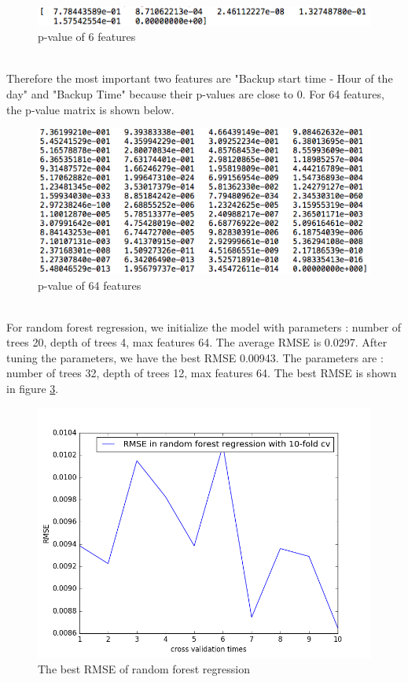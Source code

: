 \documentclass{article}
\begin{document}
\begin{figure}[htbp]
\centering
\includegraphics[width=.8\textwidth]{pvalue-6.png}
\caption{p-value of 6 features}
\label{fig:p6}
\end{figure}
\\
Therefore the most important two features are "Backup start time - Hour of the day" and "Backup Time" because their p-values are close to 0.
For 64 features, the p-value matrix is shown below.\\
\begin{figure}[htbp]
\centering
\includegraphics[width=.8\textwidth]{pvalue-64.png}
\caption{p-value of 64 features}
\label{fig:p64}
\end{figure}
\\
For random forest regression, we initialize the model with parameters : number of trees 20, depth of trees 4, max features 64. The average RMSE is 0.0297. After tuning the parameters, we have the best RMSE 0.00943. The parameters are : number of trees 32, depth of trees 12, max features 64. The best RMSE is shown in figure \ref{fig:rf}.\\
\begin{figure}[htbp]
\centering
\includegraphics[width=.6\textwidth]{rf_rmse.png}
\caption{The best RMSE of random forest regression}
\label{fig:rf}
\end{figure}
\\
\end{document}

